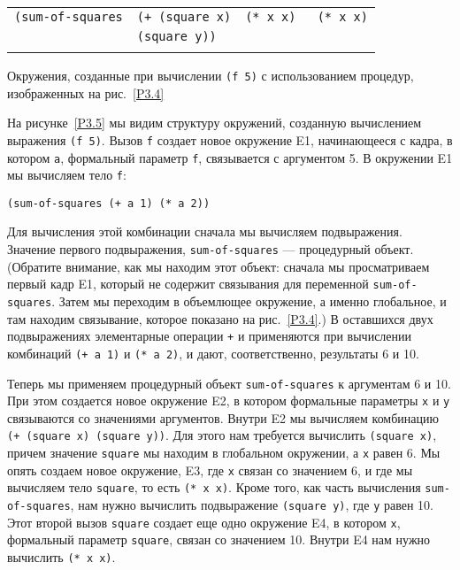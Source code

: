 \begin{cntrfig}

\begin{tabular}{llll}
{\tt (sum-of-squares} & {\tt (+ (square x)} & {\tt (* x x) } & {\tt (* x x)} \\
\hspace{8pt}{\tt (+ a 1)} & \hspace{14pt} {\tt (square y))}\\
\hspace{8pt}{\tt (+ a 2))}
\end{tabular}
\caption{Окружения, созданные при вычислении {\tt (f 5)} с использованием
процедур, изображенных на рис.~\ref{P3.4}}
\label{P3.5}

\end{cntrfig}

На рисунке~\ref{P3.5} мы видим структуру
окружений, созданную вычислением выражения {\tt (f 5)}. Вызов
{\tt f} создает новое окружение E1, начинающееся с кадра, в
котором {\tt a}, формальный параметр {\tt f},
связывается с аргументом 5.  В окружении E1 мы вычисляем тело
{\tt f}:

\begin{Verbatim}[fontsize=\small]
(sum-of-squares (+ a 1) (* a 2))
\end{Verbatim}

Для вычисления этой комбинации сначала мы вычисляем подвыражения.
Значение первого подвыражения,
{\tt sum-of-squares} --- процедурный объект.
(Обратите внимание, как мы находим этот объект: сначала мы
просматриваем первый кадр E1, который не содержит связывания для
переменной {\tt sum-of-squares}.  Затем мы переходим в
объемлющее окружение, а именно глобальное, и там находим связывание,
которое показано на рис.~\ref{P3.4}.)  В оставшихся двух
подвыражениях элементарные операции {\tt +} и {\tt *}
применяются при вычислении комбинаций {\tt (+ a 1)} и {\tt (*
a 2)}, и дают, соответственно, результаты 6 и 10.

Теперь мы применяем процедурный объект
{\tt sum-of-squares} к аргументам 6 и 10. При этом создается
новое окружение E2, в котором формальные параметры {\tt x} и
{\tt y} связываются со значениями аргументов.  Внутри E2 мы
вычисляем комбинацию {\tt (+ (square x) (square y))}. Для этого
нам требуется вычислить {\tt (square x)}, причем значение
{\tt square} мы находим в глобальном окружении, а
{\tt x} равен 6.  Мы опять создаем новое окружение, E3, где
{\tt x} связан со значением 6, и где мы вычисляем тело
{\tt square}, то есть {\tt (* x x)}. Кроме того, как
часть вычисления {\tt sum-of-squares}, нам нужно вычислить
подвыражение {\tt (square y)}, где {\tt y} равен 10.
Этот второй вызов {\tt square} создает еще одно окружение E4, в
котором {\tt x}, формальный параметр {\tt square},
связан со значением 10.  Внутри E4 нам нужно вычислить {\tt (* x
x)}.

